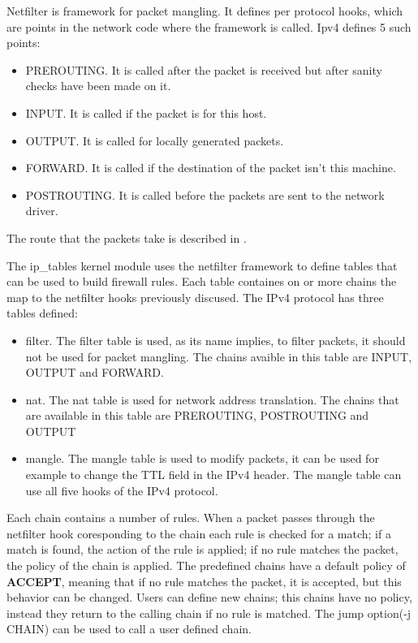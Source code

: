 Netfilter is framework for packet mangling. It defines per protocol hooks, which are points in the network code
where the framework is called. Ipv4 defines 5 such points:
\begin{itemize}
  \item PREROUTING. It is called after the packet is received but after sanity checks have been made on it.
  \item INPUT. It is called if the packet is for this host.
  \item OUTPUT.	It is called for locally generated packets.
  \item FORWARD. It is called if the destination of the packet isn't this machine.
  \item POSTROUTING. It is called before the packets are sent to the network driver.
\end{itemize}
The route that the packets take is described in .

The ip_tables kernel module uses the netfilter framework to define tables that can be used to build firewall rules.
Each table containes on or more chains the map to the netfilter hooks previously discused. 
The IPv4 protocol has three tables defined:
\begin{itemize}
  \item filter. The filter table is used, as its name implies, to filter packets, it should not be used for packet mangling. The chains
avaible in this table are INPUT, OUTPUT and FORWARD.
  \item nat. The nat table is used for network address translation. The chains that are available in this table are PREROUTING,
 POSTROUTING and OUTPUT
  \item mangle. The mangle table is used to modify packets, it can be used for example to change the TTL field in
the IPv4 header. The mangle table can use all five hooks of the IPv4 protocol.
\end{itemize}

Each chain contains a number of rules. When a packet passes through the netfilter hook coresponding to the chain each rule is checked
for a match; if a match is found, the action of the rule is applied; if no rule matches the packet, the policy of the chain is applied.
The predefined chains have a default policy of \textbf{ACCEPT}, meaning that if no rule matches the packet, it is accepted, but this behavior
can be changed. Users can define new chains; this chains have no policy, instead they return to the calling chain if no rule is matched.
The jump option(-j CHAIN) can be used to call a user defined chain.

